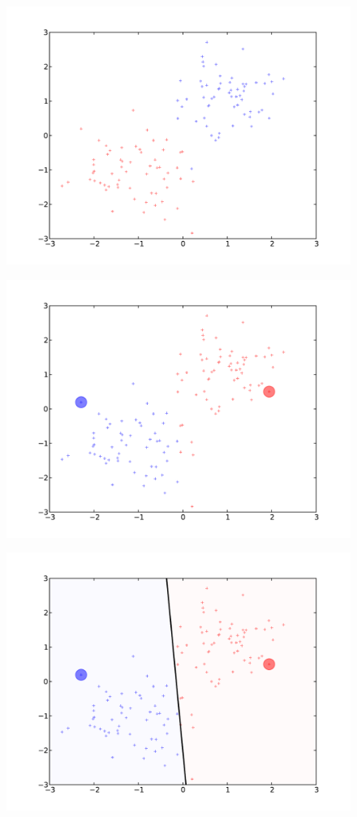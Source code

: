 \documentclass[a4paper]{article}
\begin{document}
\begin{figure}
    \centering
    \includegraphics[width=.7\textwidth]{./kmeans_regular_0.pdf}
\end{figure}
\begin{figure}
    \centering
    \includegraphics[width=.7\textwidth]{./kmeans_regular_1.pdf}
\end{figure}
\begin{figure}
    \centering
    \includegraphics[width=.7\textwidth]{./kmeans_regular_2.pdf}
\end{figure}
\end{document}
